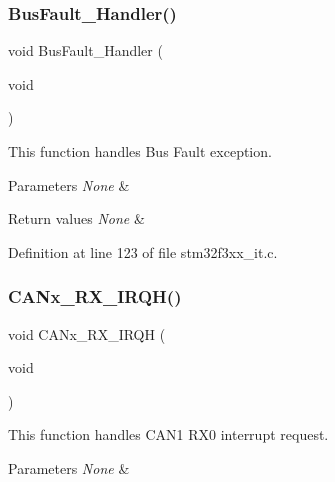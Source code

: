\mbox{\label{group___c_a_n___networking_ga850cefb17a977292ae5eb4cafa9976c3}} 
\subsubsection{Bus\+Fault\+\_\+\+Handler()}
{\footnotesize\ttfamily void Bus\+Fault\+\_\+\+Handler (\begin{DoxyParamCaption}\item[{void}]{ }\end{DoxyParamCaption})}



This function handles Bus Fault exception. 


\begin{DoxyParams}{Parameters}
{\em None} & \\
\hline
\end{DoxyParams}

\begin{DoxyRetVals}{Return values}
{\em None} & \\
\hline
\end{DoxyRetVals}


Definition at line 123 of file stm32f3xx\+\_\+it.\+c.

\mbox{\label{group___c_a_n___networking_gaca9f8efdac455d4961a096b079e9009b}} 
\subsubsection{C\+A\+Nx\+\_\+\+R\+X\+\_\+\+I\+R\+Q\+H()}
{\footnotesize\ttfamily void C\+A\+Nx\+\_\+\+R\+X\+\_\+\+I\+R\+QH (\begin{DoxyParamCaption}\item[{void}]{ }\end{DoxyParamCaption})}



This function handles C\+A\+N1 R\+X0 interrupt request. 


\begin{DoxyParams}{Parameters}
{\em None} & \\
\hline
\end{DoxyParams}

